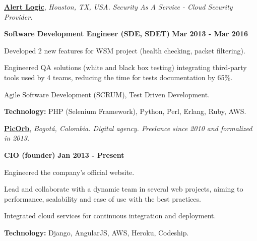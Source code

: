 \href{http://alertlogic.com/}{\textbf{Alert Logic}}, \textit{Houston, TX, USA.
Security As A Service - Cloud Security Provider.}

\begin{outerlist}
\item[\FA \faAngleDoubleRight] \textbf{Software Development Engineer (SDE,
SDET)}
\hfill
\textbf{Mar 2013 - Mar 2016}
\end{outerlist}

    \begin{innerlist}
\item Developed 2 new features for WSM project (health checking, packet
filtering).
\item Engineered QA solutions (white and black box testing) integrating
third-party tools used by 4 teams, reducing the time for tests
documentation by 65\%.
\item Agile Software Development (SCRUM), Test Driven Development.
\item \textbf{Technology:} PHP (Selenium Framework), Python, Perl, Erlang, Ruby,
AWS.
    \end{innerlist}

\quarterblankline

\href{http://www.picorb.com/}{\textbf{PicOrb}}, \textit{Bogot\'a, Colombia.
Digital agency. Freelance since 2010 and formalized in
2013.}

\begin{outerlist}
\item[\FA \faAngleDoubleRight] \textbf{CIO (founder)} \hfill \textbf{Jan 2013 -
Present}
\end{outerlist}

    \begin{innerlist}
\item Engineered the company's official website.
\item Lead and collaborate with a dynamic team in several
web projects, aiming to performance, scalability and ease of use with
the best practices.
\item Integrated cloud services for continuous integration and
deployment.
\item \textbf{Technology:} Django, AngularJS, AWS, Heroku, Codeship.
    \end{innerlist}


